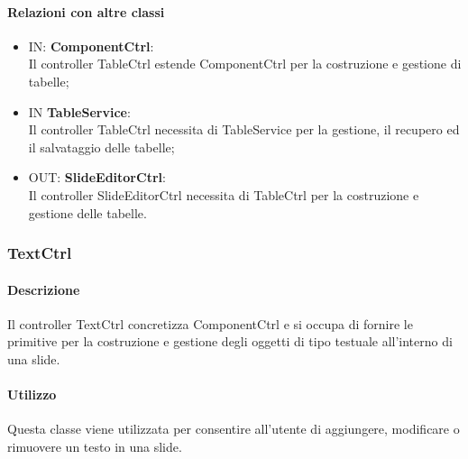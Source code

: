 	\paragraph{Relazioni con altre classi}
	\begin{itemize}
 	\item IN: \textbf{ComponentCtrl}:\\
	 	Il controller TableCtrl estende ComponentCtrl per la costruzione e gestione di tabelle;
	\item IN \textbf{TableService}:\\
		Il controller TableCtrl necessita di TableService per la gestione, il recupero ed il salvataggio delle tabelle;
	\item OUT: \textbf{SlideEditorCtrl}:\\
		Il controller SlideEditorCtrl necessita di TableCtrl per la costruzione e gestione delle tabelle. 	
	\end{itemize}

\newpage
\subsubsection{TextCtrl}
   \paragraph{Descrizione}
	Il controller TextCtrl concretizza ComponentCtrl e si occupa di fornire le primitive per la costruzione e gestione degli oggetti di tipo testuale all'interno di una slide.
		
	\paragraph{Utilizzo}
	Questa classe viene utilizzata per consentire all'utente di aggiungere, modificare o rimuovere un testo in una slide.
	
